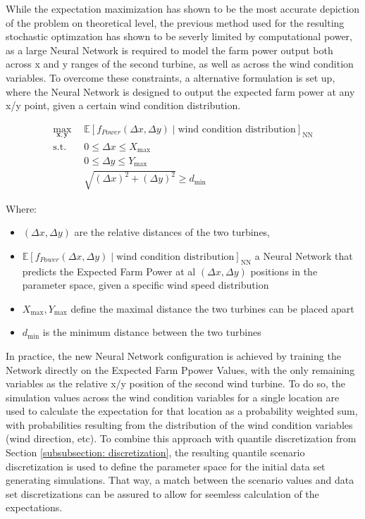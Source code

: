 While the expectation maximization has shown to be the most accurate depiction of the problem on theoretical level, the previous method used for the resulting stochastic optimzation has shown to be severly limited by computational power, as a large Neural Network is required to model the farm power output both across x and y ranges of the second turbine, as well as across the wind condition variables. 
To overcome these constraints, a alternative formulation is set up, where the Neural Network is designed to output the expected farm power at any x/y point, given a certain wind condition distribution. 



\begin{align}
	\max_{\mathbf{x}, \mathbf{y}} &  \mathbb{E}[f_{Power}(\Delta x, \Delta y) \mid \text{wind condition distribution}]_\text{NN} \\
	\text{s.t.} \quad 
	&  0  \leq \Delta x \leq X_{\max} \\
	&  0  \leq \Delta y \leq Y_{\max} \\
	& \sqrt{(\Delta x)^2 + (\Delta y)^2} \geq d_{\min}
\end{align}

Where:
\begin{itemize}
	\item \( (\Delta x, \Delta y) \) are the relative distances of the two turbines,
	\item \( \mathbb{E}[f_{Power}(\Delta x, \Delta y) \mid \text{wind condition distribution}]_\text{NN}\) a Neural Network that predicts the Expected Farm Power at al \( (\Delta x, \Delta y) \) positions in the parameter space, given a specific wind speed distribution 
	\item \(  X_{\max}, Y_{\max} \) define the maximal distance the two turbines can be placed apart
	\item \( d_{\min} \) is the minimum distance between the two turbines
\end{itemize}

In practice, the new Neural Network configuration is achieved by training the Network directly on the Expected Farm Ppower Values, with the only remaining variables as the relative x/y position of the second wind turbine. To do so, the simulation values across the wind condition variables for a single location are used to calculate the expectation for that location as a probability weighted sum, with probabilities resulting from the distribution of the wind condition variables (wind direction, etc). To combine this approach with quantile discretization from Section \ref{subsubsection: discretization}, the resulting quantile scenario discretization is used to define the parameter space for the initial data set generating simulations. That way, a match between the scenario values and data set discretizations can be assured to allow for seemless calculation of the expectations. 

